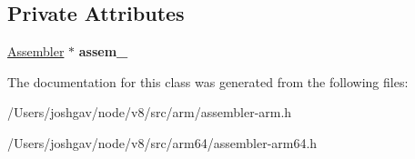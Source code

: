 \subsection*{Private Attributes}
\begin{DoxyCompactItemize}
\item 
\hyperlink{classv8_1_1internal_1_1_assembler}{Assembler} $\ast$ {\bfseries assem\+\_\+}\hypertarget{classv8_1_1internal_1_1_assembler_1_1_block_const_pool_scope_a77367b0e84a25bd6acaee68465149f82}{}\label{classv8_1_1internal_1_1_assembler_1_1_block_const_pool_scope_a77367b0e84a25bd6acaee68465149f82}

\end{DoxyCompactItemize}


The documentation for this class was generated from the following files\+:\begin{DoxyCompactItemize}
\item 
/\+Users/joshgav/node/v8/src/arm/assembler-\/arm.\+h\item 
/\+Users/joshgav/node/v8/src/arm64/assembler-\/arm64.\+h\end{DoxyCompactItemize}
